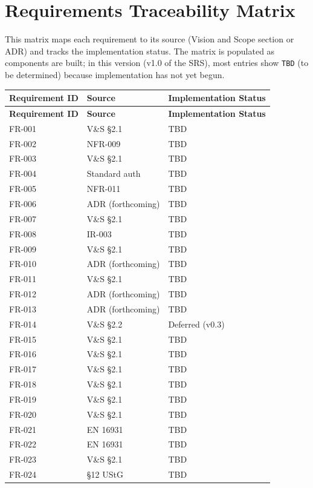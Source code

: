 \documentclass[11pt,a4paper]{article}
\begin{document}
\section{Requirements Traceability Matrix}

This matrix maps each requirement to its source (Vision and Scope section or ADR) and tracks the implementation status. The matrix is populated as components are built; in this version (v1.0 of the SRS), most entries show \texttt{TBD} (to be determined) because implementation has not yet begun.

\begin{longtable}{lll}
\toprule
\textbf{Requirement ID} & \textbf{Source} & \textbf{Implementation Status} \\
\midrule
\endfirsthead
\toprule
\textbf{Requirement ID} & \textbf{Source} & \textbf{Implementation Status} \\
\midrule
\endhead
FR-001 & V\&S \S2.1 & TBD \\
FR-002 & NFR-009 & TBD \\
FR-003 & V\&S \S2.1 & TBD \\
FR-004 & Standard auth & TBD \\
FR-005 & NFR-011 & TBD \\
FR-006 & ADR (forthcoming) & TBD \\
FR-007 & V\&S \S2.1 & TBD \\
FR-008 & IR-003 & TBD \\
FR-009 & V\&S \S2.1 & TBD \\
FR-010 & ADR (forthcoming) & TBD \\
FR-011 & V\&S \S2.1 & TBD \\
FR-012 & ADR (forthcoming) & TBD \\
FR-013 & ADR (forthcoming) & TBD \\
FR-014 & V\&S \S2.2 & Deferred (v0.3) \\
FR-015 & V\&S \S2.1 & TBD \\
FR-016 & V\&S \S2.1 & TBD \\
FR-017 & V\&S \S2.1 & TBD \\
FR-018 & V\&S \S2.1 & TBD \\
FR-019 & V\&S \S2.1 & TBD \\
FR-020 & V\&S \S2.1 & TBD \\
FR-021 & EN 16931 & TBD \\
FR-022 & EN 16931 & TBD \\
FR-023 & V\&S \S2.1 & TBD \\
FR-024 & \S12 UStG & TBD \\

\end{longtable}
\end{document}
